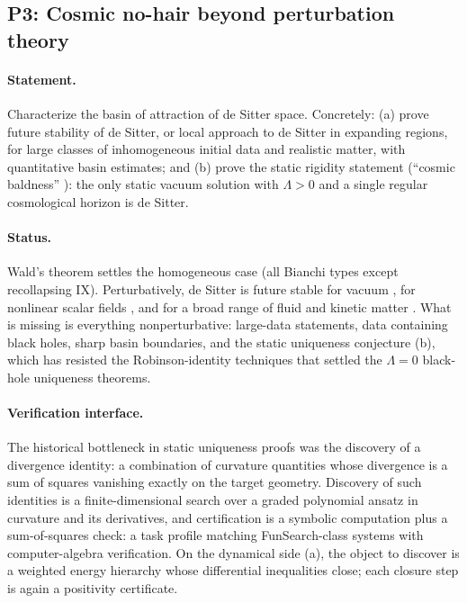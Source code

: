 \documentclass[11pt,letterpaper]{article}
\begin{document}
\subsection{P3: Cosmic no-hair beyond perturbation theory}
\label{sec:p3}

\paragraph{Statement.} Characterize the basin of attraction of de Sitter space. Concretely: (a) prove future stability of de Sitter, or local approach to de Sitter in expanding regions, for large classes of inhomogeneous initial data and realistic matter, with quantitative basin estimates; and (b) prove the static rigidity statement (``cosmic baldness'' \cite{boucher1983}): the only static vacuum solution with $\Lambda>0$ and a single regular cosmological horizon is de Sitter.

\paragraph{Status.} Wald's theorem \cite{wald1983} settles the homogeneous case (all Bianchi types except recollapsing IX). Perturbatively, de Sitter is future stable for vacuum \cite{friedrich1986}, for nonlinear scalar fields \cite{ringstrom2008}, and for a broad range of fluid and kinetic matter \cite{rodnianskispeck2013}. What is missing is everything nonperturbative: large-data statements, data containing black holes, sharp basin boundaries, and the static uniqueness conjecture (b), which has resisted the Robinson-identity techniques that settled the $\Lambda=0$ black-hole uniqueness theorems.

\paragraph{Verification interface.} The historical bottleneck in static uniqueness proofs was the discovery of a divergence identity: a combination of curvature quantities whose divergence is a sum of squares vanishing exactly on the target geometry. Discovery of such identities is a finite-dimensional search over a graded polynomial ansatz in curvature and its derivatives, and certification is a symbolic computation plus a sum-of-squares check: a task profile matching FunSearch-class systems \cite{romera2024} with computer-algebra verification. On the dynamical side (a), the object to discover is a weighted energy hierarchy whose differential inequalities close; each closure step is again a positivity certificate.
\end{document}
